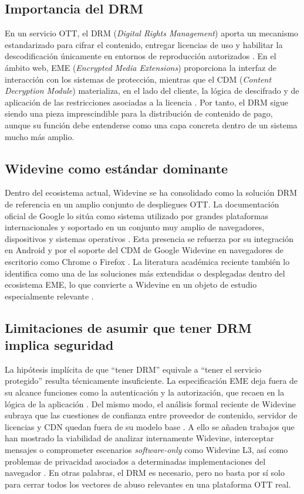 \subsection{Importancia del DRM}

En un servicio OTT, el DRM (\textit{Digital Rights Management}) aporta un mecanismo estandarizado para cifrar el contenido, entregar licencias de uso y habilitar la descodificación únicamente en entornos de reproducción autorizados \cite{w3ceme2026,widevine2024}. En el ámbito web, EME (\textit{Encrypted Media Extensions}) proporciona la interfaz de interacción con los sistemas de protección, mientras que el CDM (\textit{Content Decryption Module}) materializa, en el lado del cliente, la lógica de descifrado y de aplicación de las restricciones asociadas a la licencia \cite{w3ceme2026,delaune2024}. Por tanto, el DRM sigue siendo una pieza imprescindible para la distribución de contenido de pago, aunque su función debe entenderse como una capa concreta dentro de un sistema mucho más amplio.

\subsection{Widevine como estándar dominante}

Dentro del ecosistema actual, Widevine se ha consolidado como la solución DRM de referencia en un amplio conjunto de despliegues OTT. La documentación oficial de Google lo sitúa como sistema utilizado por grandes plataformas internacionales y soportado en un conjunto muy amplio de navegadores, dispositivos y sistemas operativos \cite{widevine2024}. Esta presencia se refuerza por su integración en Android y por el soporte del CDM de Google Widevine en navegadores de escritorio como Chrome o Firefox \cite{androiddrm2026,firefoxwidevine2022}. La literatura académica reciente también lo identifica como una de las soluciones más extendidas o desplegadas dentro del ecosistema EME, lo que convierte a Widevine en un objeto de estudio especialmente relevante \cite{patat2022,delaune2024}.

\subsection{Limitaciones de asumir que tener DRM implica seguridad}

La hipótesis implícita de que ``tener DRM'' equivale a ``tener el servicio protegido'' resulta técnicamente insuficiente. La especificación EME deja fuera de su alcance funciones como la autenticación y la autorización, que recaen en la lógica de la aplicación \cite{w3ceme2026}. Del mismo modo, el análisis formal reciente de Widevine subraya que las cuestiones de confianza entre proveedor de contenido, servidor de licencias y CDN quedan fuera de su modelo base \cite{delaune2024}. A ello se añaden trabajos que han mostrado la viabilidad de analizar internamente Widevine, interceptar mensajes o comprometer escenarios \textit{software-only} como Widevine L3, así como problemas de privacidad asociados a determinadas implementaciones del navegador \cite{patat2022,patat2023}. En otras palabras, el DRM es necesario, pero no basta por sí solo para cerrar todos los vectores de abuso relevantes en una plataforma OTT real.


